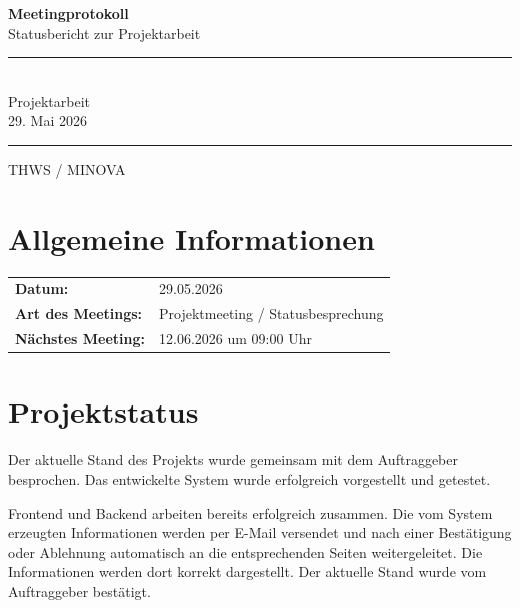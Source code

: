 \documentclass[a4paper,11pt]{article}
\begin{document}

\begin{titlepage}
    \centering

    \vspace*{3cm}

    {\Huge \textbf{Meetingprotokoll}}\\[0.5cm]
    {\Large Statusbericht zur Projektarbeit}\\[2cm]

    \rule{12cm}{0.5pt}\\[0.5cm]

    {\Large Projektarbeit}\\[0.3cm]
    {\large 29. Mai 2026}

    \rule{12cm}{0.5pt}

    \vfill

    {\large THWS / MINOVA}\\

\end{titlepage}


\tableofcontents
\newpage


\section{Allgemeine Informationen}

\begin{tabular}{ll}
\textbf{Datum:} & 29.05.2026 \\
\textbf{Art des Meetings:} & Projektmeeting / Statusbesprechung \\
\textbf{Nächstes Meeting:} & 12.06.2026 um 09:00 Uhr \\
\end{tabular}

\vspace{1cm}

\section{Projektstatus}

Der aktuelle Stand des Projekts wurde gemeinsam mit dem Auftraggeber besprochen. Das entwickelte System wurde erfolgreich vorgestellt und getestet.

Frontend und Backend arbeiten bereits erfolgreich zusammen. Die vom System erzeugten Informationen werden per E-Mail versendet und nach einer Bestätigung oder Ablehnung automatisch an die entsprechenden Seiten weitergeleitet. Die Informationen werden dort korrekt dargestellt. Der aktuelle Stand wurde vom Auftraggeber bestätigt.
\end{document}
